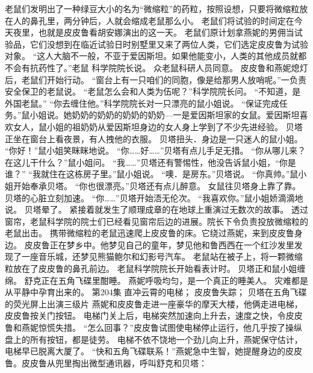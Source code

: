 \documentclass[a4paper,12pt,UTF8,twoside]{ctexbook}
\begin{document}
        老鼠们发明出了一种绿豆大小的名为“微缩粒”的药粒，按照设想，只要将微缩粒放在人的鼻孔里，两分钟后，人就会缩成老鼠那么小。  
        老鼠们将试验的时间定在今天夜里，也就是皮皮鲁看胡安娜演出的这一天。  
        老鼠们原计划拿燕妮的男佣当试验品，它们没想到在临近试验日时别墅里又来了两位人类，它们选定皮皮鲁为试验对象。  
        “这人大脑不一般，不亚于爱因斯坦。如果他能变小，人类的其他成员就都不会有抗药性了。”老鼠        科学院院长说。  
        众老鼠科研人员同意。  
        皮皮鲁和燕妮熄灯后，老鼠们开始行动。  
        “窗台上有一只咱们的同胞，像是给那男人放哨呢。”一负责安全保卫的老鼠说。  
        “老鼠怎么会和人类为伍呢？”科学院院长问。  
        “不知道，是外国老鼠。”  
        “你去缠住他。”科学院院长对一只漂亮的鼠小姐说。  
        “保证完成任务。”鼠小姐说。她奶奶的奶奶的奶奶的奶奶---一是爱因斯坦家的女鼠。爱因斯坦喜欢女人，鼠小姐的祖奶奶从爱因斯坦身边的女人身上学到了不少先进经验。  
        贝塔正坐在窗台上看夜景，有人拽他的衣服。  
        贝塔扭头．身边是一只迷人的鼠小姐。  
        “你好！”鼠小姐笑眯眯地说。  
        “你……好……”贝塔有点儿手足无措。  
        “你从哪儿来？在这儿干什么？”鼠小姐问。  
        “我……”贝塔还有警惕性，他没告诉鼠小姐，“你是谁？”  
        “我就住在这栋房子里。”鼠小姐说。  
        “噢．是房东。”贝塔说。  
        “你真帅。”鼠小姐开始奉承贝塔。  
        “你也很漂亮。”贝塔还有点儿醉意。        
        女鼠往贝塔身上靠了靠。  
        贝塔的心脏立刻加速。  
        “你……”贝塔开始浯无伦次。  
        “我喜欢你。”鼠小姐娇滴滴地说。  
        贝塔晕了。  
        紧接着就发生了顺理成章的在地球上重演过无数次的故事。  
        透过窗帘，老鼠科学院的院士们已经看见窗帘后边的进展。院长下令负责投放微缩粒的老鼠出击。  
        携带微缩粒的老鼠迅速爬上皮皮鲁的床。它绕过燕妮，来到皮皮鲁身边。  
        皮皮鲁正在梦乡中。他梦见自己的童年，梦见他和鲁西西在一个红沙发里发现了一座音乐城，还梦见熊猫鲍尔和幻影号汽车。  
        老鼠站在被子上，将一颗微缩粒放在了皮皮鲁的鼻孔前边。  
        老鼠科学院院长开始看表计时。  
        贝塔正和鼠小姐缠绵。  
        舒克正在五角飞碟里酣睡。  
        燕妮呼吸均匀，是一个真正的睡美人。  
        灾难都是从平静中孕育出来的。          第204集  
        直冲云霄的电梯；  
        皮皮鲁失踪；  
        贝塔在五角飞碟的荧光屏上出演三级片    
        燕妮和皮皮鲁走进一座豪华的摩天大楼，他俩走进电梯，皮皮鲁按关门按钮。  
        电梯门关上后，电梯突然加速向上升去，速度之快，令皮皮鲁和燕妮惊慌失措。  
        “怎么回事？”皮皮鲁试图使电梯停止运行，他几乎按了操纵盘上的所有按钮，都是徒劳。  
        电梯不依不饶地一个劲儿向上升，燕妮保守估计，电梯早已脱离大厦了。  
        “快和五角飞碟联系！”燕妮急中生智，她提醒身边的皮皮鲁。皮皮鲁从兜里掏出微型通讯器，呼叫舒克和贝塔：  
\end{document}
